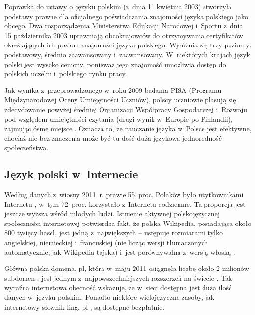 \begin{multicols}{2}
Poprawka do ustawy o~języku polskim (z~dnia 11 kwietnia 2003)
stworzyła podstawy prawne dla oficjalnego poświadczania znajomości
języka polskiego jako obcego. Dwa rozporządzenia Ministerstwa
Edukacji Narodowej i~Sportu z~dnia 15 października 2003 uprawniają
obcokrajowców do otrzymywania certyfikatów określających ich
poziom znajomości języka polskiego. Wyróżnia się trzy poziomy:
podstawowy, średnio zaawansowany i~zaawansowany. W~niektórych
krajach język polski jest wysoko ceniony, ponieważ jego znajomość
umożliwia dostęp do polskich uczelni i~polskiego rynku pracy. 


Jak wynika z~przeprowadzonego w~roku 2009 badania PISA (Programu
Międzynarodowej Oceny Umiejętności Uczniów), polscy uczniowie
plasują się zdecydowanie powyżej średniej Organizacji Współpracy
Gospodarczej i~Rozwoju pod względem umiejętności czytania (drugi
wynik w~Europie po Finlandii), zajmując ósme miejsce \cite{Oecd1}.
Oznacza to, że nauczanie języka w~Polsce jest efektywne, chociaż
nie bez znaczenia może być tu dość duża językowa jednorodność
społeczeństwa. 

\subsection[Język polski w~Internecie]{Język polski w~Internecie}
Według danych z~wiosny 2011~r. prawie 55~proc. Polaków było
użytkownikami Internetu \cite{Rp1}, w~tym 72~proc. korzystało
z~Internetu codziennie. Ta proporcja jest jeszcze wyższa wśród
młodych ludzi. Istnienie aktywnej polskojęzycznej społeczności
internetowej potwierdza fakt, że polska Wikipedia, posiadająca
około 800 tysięcy haseł, jest jedną z~największych – ustępuje
rozmiarami tylko angielskiej, niemieckiej i~francuskiej (nie licząc
wersji tłumaczonych automatycznie, jak Wikipedia tajska) i~jest
porównywalna z~wersją włoską \cite{Wiki1}. 


Główna polska domena. pl, która w~maju 2011 osiągnęła liczbę
około 2 milionów subdomen \cite{Krd1}, jest jednym
z~najpowszechniejszych rozszerzeń na świecie \cite{ebrands1}. Tak
wyraźna internetowa obecność wskazuje, że w~sieci dostępna jest
duża ilość danych w~języku polskim. Ponadto niektóre
wielojęzyczne zasoby, jak internetowy słownik ling. pl \cite{ling1},
są dostępne bezpłatnie. 


\end{multicols}
